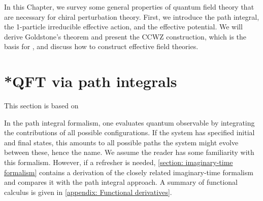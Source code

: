 In this Chapter, we survey some general properties of quantum field theory that are necessary for chiral perturbation theory.
First, we introduce the path integral, the 1-particle irreducible effective action, and the effective potential.
We will derive Goldstone's theorem and present the CCWZ construction, which is the basis for \chpt, and discuss how to construct effective field theories.




\section{*QFT via path integrals}
\label{section: path integral}

This section is based on \autocite{peskinIntroductionQuantumField1995,weinbergQuantumTheoryFields1995,weinbergQuantumTheoryFields1996,schwartzQuantumFieldTheory2013}

In the path integral formalism, one evaluates quantum observable by integrating the contributions of all possible configurations.
If the system has specified initial and final states, this amounts to all possible paths the system might evolve between these, hence the name.
We assume the reader has some familiarity with this formalism. 
However, if a refresher is needed, \autoref{section: imaginary-time formalism} contains a derivation of the closely related imaginary-time formalism and compares it with the path integral approach.
A summary of functional calculus is given in \autoref{appendix: Functional derivatives}.

